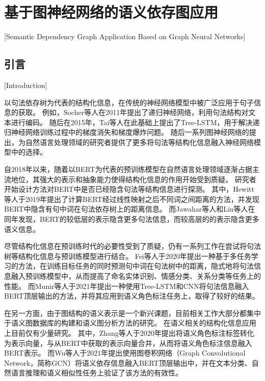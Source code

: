 
\chapter[基于图神经网络的语义依存图应用]{基于图神经网络的语义依存图应用}[Semantic Dependency Graph Application Based on Graph Neural Networks]

\section{引言}[Introduction]
\label{sec:chapter5-intro}

以句法依存树为代表的结构化信息，在传统的神经网络模型中被广泛应用于句子信息的获取。
例如，Socher等人\cite{socher-etal-2011-parsing}在2011年提出了递归神经网络，利用句法结构对文本进行编码。
随后在2015年，Tai等人在此基础上提出了Tree-LSTM，用于解决递归神经网络训练过程中的梯度消失和梯度爆炸问题。
随后一系列图神经网络\cite{kipf-welling-2017-semi, velickovic-etal-2018-gat}的提出，为自然语言处理领域的研究者提供了更多将句法等结构化信息融入神经网络模型中的选择。


自2018年以来，随着以BERT为代表的预训练模型在自然语言处理领域逐渐占据主流地位，其强大的表示和抽象能力使得结构化信息的作用开始受到质疑。
研究者开始设计方法对BERT中是否已经隐含句法等结构信息进行探测。
其中，Hewitt等人\cite{hewitt-manning-2019-structural}于2019年提出了计算BERT经过线性映射之后不同词之间距离的方法，并发现BERT中隐含有句中词在句法依存树上的距离信息。
而Jawahar等人\cite{jawahar-etal-2019-bert}和Lin等人\cite{lin-etal-2019-open}在同年发现，BERT的较低层的表示隐含更多句法信息，而较高层的的表示隐含更多语义信息。

尽管结构化信息在预训练时代的必要性受到了质疑，仍有一系列工作在尝试将句法树等结构化信息与预训练模型进行结合。
Fei等人\cite{fei-etal-2020-retrofitting}于2020年提出一种基于多任务学习的方法，在训练目标任务的同时预测句中词在句法树中的距离，隐式地将句法信息融入预训练模型中，从而提高了命名实体识别、情感分类、关系分类等任务上的性能。
而Munir等人\cite{munir-etal-2021-adaptive}于2021年提出一种使用Tree-LSTM和CNN将句法信息融入BERT顶层输出的方法，并将其应用到语义角色标注任务上，取得了较好的结果。

在另一方面，由于图结构的语义表示是一个新兴课题，目前相关工作大部分都集中于语义图数据库的构建\cite{banarescu-etal-2013-abstract,abend-rappoport-2013-universal,oepen-etal-2015-semeval,che-etal-2016-semeval}和语义图分析方法的研究\cite{hershcovich-etal-2017-transition,dozat-manning-2018-simpler,cai-lam-2020-amr}。
在语义相关的结构化信息应用上目前仅有少量研究。
其中，Zhang等人\cite{zhang-etal-2020-semantics}于2020年提出将语义角色标注标签转化为表示向量，与从BERT中获取的表示向量合并，从而将语义角色标注信息融入BERT表示。
而Wu等人\cite{wu-etal-2021-infusing}于2021年提出使用图卷积网络\cite{kipf-welling-2017-semi}（Graph Convolutional Network，简称GCN）将语义依存信息融入BERT顶层输出中，并在文本分类、自然语言推理和语义相似性任务上验证了该方法的有效性。

